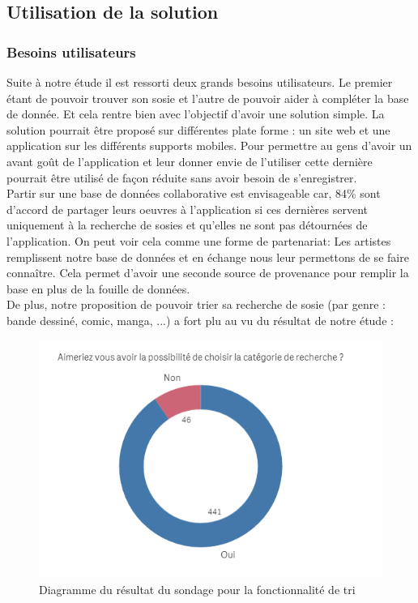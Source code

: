 \documentclass[a4paper,12pt]{article}
\begin{document}
\subsection{Utilisation de la solution}
\subsubsection{Besoins utilisateurs}
Suite à notre étude il est ressorti deux grands besoins utilisateurs. Le premier étant de pouvoir trouver son sosie et l'autre de pouvoir aider à compléter la base de donnée. Et cela rentre bien avec l'objectif d'avoir une solution simple. La solution pourrait être proposé sur différentes plate forme : un site web et une application sur les différents supports mobiles. Pour permettre au gens d'avoir un avant goût de l'application et leur donner envie de l'utiliser cette dernière pourrait être utilisé de façon réduite sans avoir besoin de s'enregistrer. 
\\ Partir sur une base de données collaborative est envisageable car, 84\% sont d'accord de partager leurs oeuvres à l'application si ces dernières servent uniquement à la recherche de sosies et qu'elles ne sont pas détournées de l'application. On peut voir cela comme une forme de partenariat: Les artistes remplissent notre base de données et en échange nous leur permettons de se faire connaître. Cela permet d'avoir une seconde source de provenance pour remplir la base en plus de la fouille de données. 
\\De plus, notre proposition de pouvoir trier sa recherche de sosie (par genre : bande dessiné, comic, manga, ...) a fort plu au vu du résultat de notre étude :
\begin{figure}[!ht]
    \centering
        \includegraphics[scale=1]{images/Memoire_sondage_1.PNG}
        \caption{Diagramme du résultat du sondage pour la fonctionnalité de tri}
    \end{figure}
\end{document}
